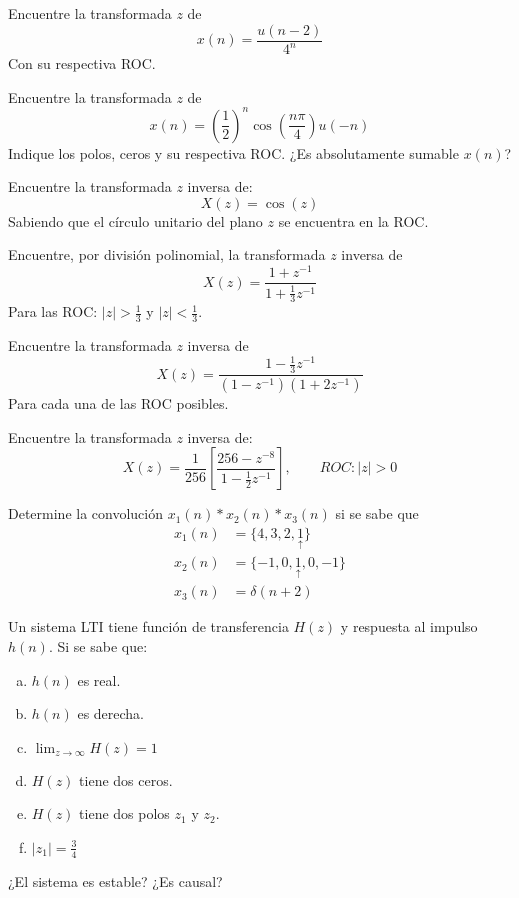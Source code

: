 \begin{ejercicio}
	Encuentre la transformada $z$ de
	$$ x(n) = \frac{u(n-2)}{4^n} $$
	Con su respectiva ROC.
\end{ejercicio}

\begin{ejercicio}
	Encuentre la transformada $z$ de 
	$$ x(n) = \left(\frac{1}{2}\right)^n \cos \left( \frac{n\pi}{4} \right) u(-n) $$
	Indique los polos, ceros y su respectiva ROC. ¿Es absolutamente sumable $x(n)$?
\end{ejercicio}

\begin{ejercicio}
	Encuentre la transformada $z$ inversa de:
	$$ X(z) = \cos (z) $$
	Sabiendo que el círculo unitario del plano $z$ se encuentra en la ROC.
\end{ejercicio}

\begin{ejercicio}
	Encuentre, por división polinomial, la transformada $z$ inversa de
	$$ X(z) = \frac{1+z^{-1}}{1+\frac{1}{3}z^{-1}} $$
	Para las ROC: $|z|>\frac{1}{3}$ y $|z|< \frac{1}{3}$.
\end{ejercicio}

\begin{ejercicio}
	Encuentre la transformada $z$ inversa de
	$$ X(z) = \frac{1-\frac{1}{3}z^{-1}}{(1-z^{-1})(1+2z^{-1})} $$
	Para cada una de las ROC posibles.
\end{ejercicio}

\begin{ejercicio}
	Encuentre la transformada $z$ inversa de:
	$$ X(z) = \frac{1}{256}\left[\dfrac{256-z^{-8}}{1-\frac{1}{2}z^{-1}} \right], \qquad ROC:|z|>0 $$
\end{ejercicio}

\begin{ejercicio}
	Determine la convolución $x_1(n)*x_2(n)*x_3(n)$ si se sabe que
	\begin{align*}
		x_1(n) &= \{ 4,3,2,\underset{\uparrow}{1} \} \\
		x_2(n) &= \{ -1,0,\underset{\uparrow}{1},0,-1 \} \\
		x_3(n) &= \delta(n+2)
	\end{align*}
\end{ejercicio}

\begin{ejercicio}
	Un sistema LTI tiene función de transferencia $H(z)$ y respuesta al impulso $h(n)$. Si se sabe que:
	\begin{enumerate}[a.]
		\item $h(n)$ es real.
		\item $h(n)$ es derecha.
		\item $\lim_{z\to\infty} H(z)=1$
		\item $H(z)$ tiene dos ceros.
		\item $H(z)$ tiene dos polos $z_1$ y $z_2$.
		\item $|z_1| = \frac{3}{4}$ 
	\end{enumerate}
	¿El sistema es estable? ¿Es causal?
\end{ejercicio}